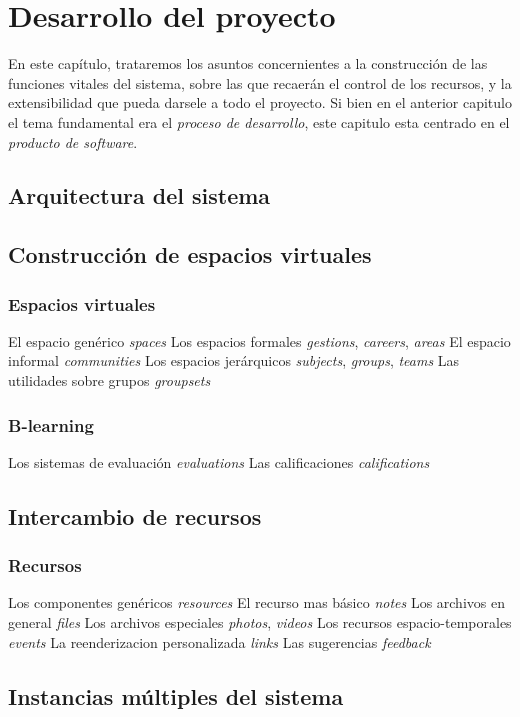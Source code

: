 \chapter{Desarrollo del proyecto}

En este capítulo, trataremos los asuntos concernientes a la construcción de
las funciones vitales del sistema, sobre las que recaerán el control de los
recursos, y la extensibilidad que pueda darsele a todo el proyecto. Si bien en el anterior capitulo el tema fundamental era el \emph{proceso de desarrollo}, este capitulo esta centrado en el \emph{producto de software}.

\section{Arquitectura del sistema}

\section{Construcción de espacios virtuales}
\subsection{Espacios virtuales}
El espacio genérico \emph{spaces}
Los espacios formales \emph{gestions}, \emph{careers}, \emph{areas}
El espacio informal \emph{communities}
Los espacios jerárquicos \emph{subjects}, \emph{groups}, \emph{teams}
Las utilidades sobre grupos \emph{groupsets}
\subsection{B-learning}
Los sistemas de evaluación \emph{evaluations}
Las calificaciones \emph{califications}

\section{Intercambio de recursos}
\subsection{Recursos}
Los componentes genéricos \emph{resources}
El recurso mas básico \emph{notes}
Los archivos en general \emph{files}
Los archivos especiales \emph{photos}, \emph{videos}
Los recursos espacio-temporales \emph{events}
La reenderizacion personalizada \emph{links}
Las sugerencias \emph{feedback}

\section{Instancias múltiples del sistema}
